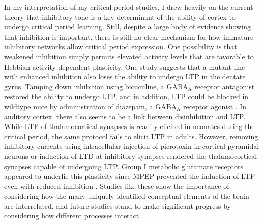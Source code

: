 In my interpretation of my critical period studies, I drew heavily on the current theory that inhibitory tone is a key determinant of the ability of cortex to undergo critical period learning. Still, despite a large body of evidence showing that inhibition is important, there is still no clear mechanism for how immature inhibitory networks allow critical period expression. One possibility is that weakened inhibition simply permits elevated activity levels that are favorable to Hebbian activity-dependent plasticity. One study suggests that a mutant line with enhanced inhibition also loses the ability to undergo LTP in the dentate gyrus. Tamping down inhibition using bicuculine, a GABA$_\mathrm{A}$ receptor antagonist restored the ability to undergo LTP, and in addition, LTP could be blocked in wildtype mice by administration of diazepam, a GABA$_\mathrm{A}$ receptor agonist \cite{Levkovitz1999}. In auditory cortex, there also seems to be a link between disinhibition and LTP. While LTP of thalamocortical synapses is readily elicited in neonates during the critical period, the same protocol fails to elicit LTP in adults. However, removing inhibitory currents using intracellular injection of picrotoxin in cortical pyramidal neurons or induction of LTD at inhibitory synapses rendered the thalamocortical synapses capable of undergoing LTP. Group I metabolic glutamate receptors appeared to underlie this plasticity since MPEP prevented the induction of LTP even with reduced inhibition \cite{Chun2013}. Studies like these show the importance of considering how the many uniquely identified conceptual elements of the brain are interrelated, and future studies stand to make significant progress by considering how different processes interact.